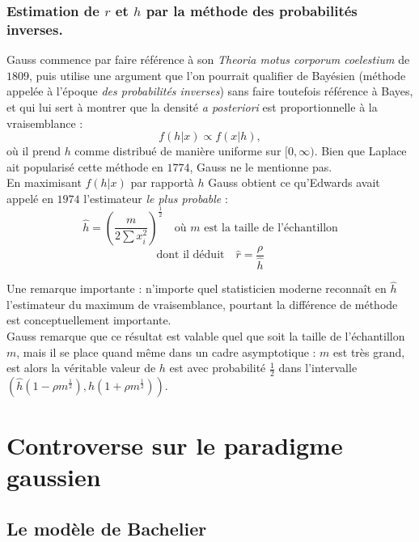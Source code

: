 \documentclass{article}
\begin{document}
\subsubsection{Estimation de $r$ et $h$ par la méthode des probabilités inverses.} Gauss commence par faire référence à son \textit{Theoria motus corporum coelestium} de $1809$, puis utilise une argument que l'on pourrait qualifier de Bayésien (méthode appelée à l'époque \textit{des probabilités inverses}) sans faire toutefois référence à Bayes, et qui lui sert à montrer que la densité \textit{a posteriori} est proportionnelle à la vraisemblance :
\[f(h|x)\propto f(x|h),\]
où il prend $h$ comme distribué de manière uniforme sur $[0,\infty)$. Bien que Laplace ait popularisé cette méthode en $1774$, Gauss ne le mentionne pas.\\
En maximisant $f(h|x)$ par rapportà $h$ Gauss obtient ce qu'Edwards avait appelé en $1974$ %
l'estimateur \textit{le plus probable} :
\[\hat h = \left(\frac{m}{2\sum x_i^2}\right)^{\frac{1}{2}} \quad \text{où $m$ est la taille de l'échantillon}\]
\[\text{dont il déduit} \quad \hat r =\frac{\rho}{\hat h}\]

Une remarque importante : n'importe quel statisticien moderne reconnaît en $\hat h$ l'estimateur du maximum de vraisemblance, pourtant la différence de méthode est conceptuellement importante.\\

Gauss remarque que ce résultat est valable quel que soit la taille de l'échantillon $m$, mais il se place quand même dans un cadre asymptotique : $m$ est très grand, est alors la véritable valeur de $h$ est avec probabilité $\frac{1}{2}$ dans l'intervalle $(\hat h (1-\rho m^{\frac{1}{2}}),\hat h (1+\rho m^{\frac{1}{2}}))$. 
\section{Controverse sur le paradigme gaussien}

\subsection{Le modèle de Bachelier}
\end{document}
